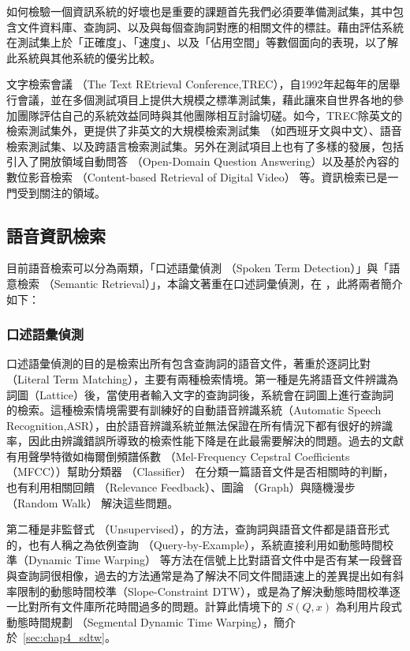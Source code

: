如何檢驗一個資訊系統的好壞也是重要的課題首先我們必須要準備測試集，其中包含文件資料庫、查詢詞、以及與每個查詢詞對應的相關文件的標註。藉由評估系統在測試集上於「正確度」、「速度」、以及「佔用空間」等數個面向的表現，以了解此系統與其他系統的優劣比較。

文字檢索會議 （The Text REtrieval Conference,TREC），自1992年起每年的居舉行會議，並在多個測試項目上提供大規模之標準測試集，藉此讓來自世界各地的參加團隊評估自己的系統效益同時與其他團隊相互討論切磋。如今，TREC除英文的檢索測試集外，更提供了非英文的大規模檢索測試集
（如西班牙文與中文）、語音檢索測試集、以及跨語言檢索測試集。另外在測試項目上也有了多樣的發展，包括引入了開放領域自動問答
（Open-Domain Question Answering）以及基於內容的數位影音檢索
（Content-based Retrieval of Digital Video）
等。資訊檢索已是一門受到關注的領域。



\subsection{語音資訊檢索}
目前語音檢索可以分為兩類，「口述語彙偵測 （Spoken Term Detection）」與「語意檢索 （Semantic Retrieval）」，本論文著重在口述詞彙偵測，在
，此將兩者簡介如下：

\subsubsection{口述語彙偵測}


口述語彙偵測的目的是檢索出所有包含查詢詞的語音文件，著重於逐詞比對（Literal
Term
Matching），主要有兩種檢索情境。第一種是先將語音文件辨識為詞圖（Lattice）後，當使用者輸入文字的查詢詞後，系統會在詞圖上進行查詢詞的檢索。這種檢索情境需要有訓練好的自動語音辨識系統（Automatic Speech Recognition,ASR），由於語音辨識系統並無法保證在所有情況下都有很好的辨識率，因此由辨識錯誤所導致的檢索性能下降是在此最需要解決的問題。過去的文獻有用聲學特徵如梅爾倒頻譜係數
（Mel-Frequency Cepstral Coefficients （MFCC））幫助分類器 （Classifier）
在分類一篇語音文件是否相關時的判斷，也有利用相關回饋 （Relevance Feedback）、圖論 （Graph）與隨機漫步 （Random Walk）
解決這些問題。

第二種是非監督式
（Unsupervised），的方法，查詢詞與語音文件都是語音形式的，也有人稱之為依例查詢
（Query-by-Example），系統直接利用如動態時間校準（Dynamic Time Warping）
等方法在信號上比對語音文件中是否有某一段聲音與查詢詞很相像，過去的方法通常是為了解決不同文件間語速上的差異提出如有斜率限制的動態時間校準（Slope-Constraint
DTW），或是為了解決動態時間校準逐一比對所有文件庫所花時間過多的問題。計算此情境下的
$S(Q, x)$ 為利用片段式動態時間規劃 （Segmental Dynamic Time Warping），簡介於~\ref{sec:chap4_sdtw}。

